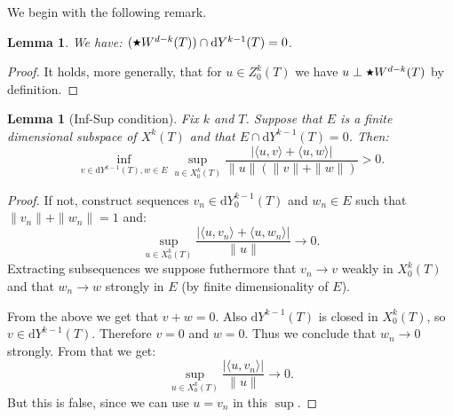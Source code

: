 \documentclass[10pt,a4paper]{article}
\newcommand{\rmd}{\mathrm{d}}
\newcommand{\rmP}{\mathrm{P}}
\newcommand{\hs}{\raisebox{1pt}{$\scriptstyle \bigstar$}}
\newcommand{\poly}{\rmP}
\newtheorem{lemma}[theorem]{Lemma}
\theoremstyle{remark}
\theoremstyle{definition}
\numberwithin{equation}{section}
\begin{document}
 We begin with the following remark.
\begin{lemma} We have: $(\hs W^{d-k}(T)) \cap \rmd Y^{k-1}(T) = 0$.
\end{lemma}
\begin{proof}


It holds, more generally, that for $u \in Z^{k}_0(T)$ we have $u \perp \hs W^{d-k}(T)$ by definition.
\end{proof}


\begin{lemma}[Inf-Sup condition]\label{lem:infsup} Fix $k$ and $T$. Suppose that $E$ is a finite dimensional subspace of $X^k(T)$  and that $E \cap \rmd Y^{k-1}(T) = 0$. Then:
\begin{equation}
  \inf_{v \in \rmd Y^{k-1}(T), w \in E} \sup_{u\in X^k_0(T)} \frac{|\langle u, v \rangle + \langle u, w \rangle|}{\| u\| (\| v \| + \| w\|)} >0.
\end{equation}
\end{lemma}
\begin{proof}
  If not, construct sequences $v_n \in \rmd Y^{k-1}_0(T)$ and $w_n \in E$ such that $\|v_n\| +\|w_n\| = 1$ and:
  \begin{equation}
    \sup_{u\in X^k_0(T)} \frac{|\langle u, v_n \rangle + \langle u, w_n \rangle|}{\| u\|} \to 0.
  \end{equation}
  Extracting subsequences we suppose futhermore that $v_n \to v$ weakly in $X^k_0(T)$ and that $w_n \to w$ strongly in $E$ (by finite dimensionality of $E$).

  From the above we get that $v + w = 0$. Also $\rmd Y^{k-1}(T)$ is closed in $X^k_0(T)$, so $v\in \rmd Y^{k-1}(T)$. Therefore $v= 0$ and $w= 0$. Thus we conclude that $w_n \to 0$ strongly. From that we get:
  \begin{equation}
    \sup_{u\in X^k_0(T)} \frac{|\langle u, v_n \rangle|}{\| u\|} \to 0.
  \end{equation}
  But this is false, since we can use $u = v_n$ in this $\sup$.
  \end{proof}
\end{document}
